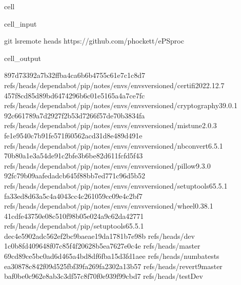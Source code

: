 \documentclass[letterpaper,table,10pt,english]{jupyterBook}
\begin{document}
\begin{sphinxuseclass}{cell}\begin{sphinxVerbatimInput}

\begin{sphinxuseclass}{cell_input}
\begin{sphinxVerbatim}[commandchars=\\\{\}]
git ls\PYGZhy{}remote \PYGZhy{}\PYGZhy{}heads https://github.com/phockett/ePSproc
\end{sphinxVerbatim}

\end{sphinxuseclass}\end{sphinxVerbatimInput}
\begin{sphinxVerbatimOutput}

\begin{sphinxuseclass}{cell_output}
\begin{sphinxVerbatim}[commandchars=\\\{\}]
897d73392a7b32ffba4ca6b6b4755c61e7c1c8d7	refs/heads/dependabot/pip/notes/envs/envs\PYGZhy{}versioned/certifi\PYGZhy{}2022.12.7
457f8cd85d89bd6474296b6c01e5165a4a7ce7fc	refs/heads/dependabot/pip/notes/envs/envs\PYGZhy{}versioned/cryptography\PYGZhy{}39.0.1
92c661789a7d2927f2b53d7266f57de70b3834fa	refs/heads/dependabot/pip/notes/envs/envs\PYGZhy{}versioned/mistune\PYGZhy{}2.0.3
fe1e9540c7b91fe571f60562acd31d8e489d491e	refs/heads/dependabot/pip/notes/envs/envs\PYGZhy{}versioned/nbconvert\PYGZhy{}6.5.1
70b80a1e3a54de91c2bfe3b6be82d611fcfd5f43	refs/heads/dependabot/pip/notes/envs/envs\PYGZhy{}versioned/pillow\PYGZhy{}9.3.0
92fc79b09aafedadcb645f88bb7ed771c96d5b52	refs/heads/dependabot/pip/notes/envs/envs\PYGZhy{}versioned/setuptools\PYGZhy{}65.5.1
fa33ed8d63a5c4a4043cc4c261059cc09e4c2bf7	refs/heads/dependabot/pip/notes/envs/envs\PYGZhy{}versioned/wheel\PYGZhy{}0.38.1
41cdfe43750e08c510f98b05e024a9c62da42771	refs/heads/dependabot/pip/setuptools\PYGZhy{}65.5.1
dec4e5902adc562ef2bc9baeae19da1781b7e98b	refs/heads/dev
1c0b8fd409648f07c85f4f20628b5ea7627e0c4e	refs/heads/master
69cd89ce5bc0ad6d465a4bd8df6fba15d3fd1aee	refs/heads/numba\PYGZhy{}tests
ea30878c842f09d525fbf39fa269fa2302a13b57	refs/heads/revert\PYGZhy{}9\PYGZhy{}master
baf0be0c962e8ab3c3df57c8f70f0e939f99cbd7	refs/heads/testDev
\end{sphinxVerbatim}

\end{sphinxuseclass}\end{sphinxVerbatimOutput}

\end{sphinxuseclass}
\end{document}
